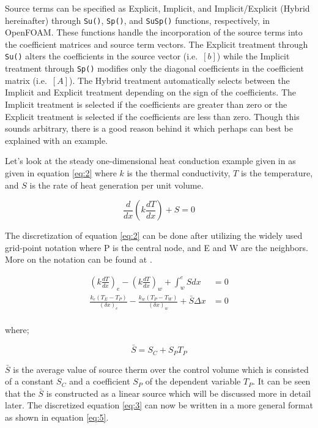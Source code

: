 \documentclass[
]{book}
\begin{document}
Source terms can be specified as Explicit, Implicit, and Implicit/Explicit (Hybrid hereinafter) through \texttt{Su()}, \texttt{Sp()}, and \texttt{SuSp()} functions, respectively, in OpenFOAM. These functions handle the incorporation of the source terms into the coefficient matrices and source term vectors. The Explicit treatment through \texttt{Su()} alters the coefficients in the source vector (i.e.~\([b]\)) while the Implicit treatment through \texttt{Sp()} modifies only the diagonal coefficients in the coefficient matrix (i.e.~\([A]\)). The Hybrid treatment automatically selects between the Implicit and Explicit treatment depending on the sign of the coefficients. The Implicit treatment is selected if the coefficients are greater than zero or the Explicit treatment is selected if the coefficients are less than zero. Though this sounds arbitrary, there is a good reason behind it which perhaps can best be explained with an example.

Let's look at the steady one-dimensional heat conduction example given in \citet{patankar_2018_numerical} as given in equation \eqref{eq:2} where \(k\) is the thermal conductivity, \(T\) is the temperature, and \(S\) is the rate of heat generation per unit volume.

\begin{equation}
\frac{d}{d x}\left(k \frac{d T}{d x}\right)+S=0
\label{eq:2}
\end{equation}

The discretization of equation \eqref{eq:2} can be done after utilizing the widely used grid-point notation where P is the central node, and E and W are the neighbors. More on the notation can be found at \citet{patankar_2018_numerical}.

\begin{equation}
\begin{aligned}
\left(k \frac{d T}{d x}\right)_e-\left(k \frac{d T}{d x}\right)_w+\int_w^e S d x &=0 \\
\frac{k_e\left(T_E-T_P\right)}{(\delta x)_e}-\frac{k_w\left(T_P-T_W\right)}{(\delta x)_w}+\bar{S} \Delta x &=0 \\
\end{aligned}
 \label{eq:3}
\end{equation}

where;

\begin{equation}
\bar{S}=S_C+S_P T_P
 \label{eq:4}
\end{equation}

\(\bar{S}\) is the average value of source therm over the control volume which is consisted of a constant \(S_C\) and a coefficient \(S_P\) of the dependent variable \(T_P\). It can be seen that the \(\bar{S}\) is constructed as a linear source which will be discussed more in detail later. The discretized equation \eqref{eq:3} can now be written in a more general format as shown in equation \eqref{eq:5}.
\end{document}
